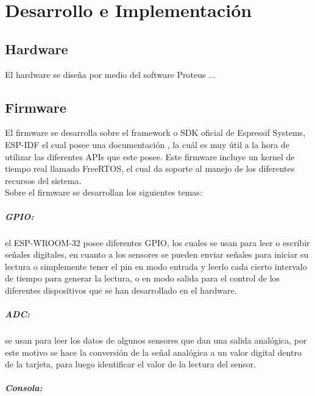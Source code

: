 \chapter{Desarrollo e Implementación}

\section{Hardware}

El hardware se diseña por medio del software Proteus ...

\section{Firmware}

El firmware se desarrolla sobre el framework o SDK oficial de Espressif Systems, ESP-IDF el cual posee una documentación \cite{ES}, la cuál es muy útil a la hora de utilizar las diferentes APIs que este posee. Este firmware incluye un kernel de tiempo real llamado FreeRTOS, el cual da soporte al manejo de los diferentes recursos del sistema.\\

Sobre el firmware se desarrollan los siguientes temas:

\paragraph{GPIO:}

el ESP-WROOM-32 posee diferentes GPIO, los cuales se usan para leer o escribir señales digitales, en cuanto a los sensores se pueden enviar señales para iniciar su lectura o simplemente tener el pin en modo entrada y leerlo cada cierto intervalo de tiempo para generar la lectura, o en modo salida para el control de los diferentes dispositivos que se han desarrollado en el hardware.

\paragraph{ADC:}

se usan para leer los datos de algunos sensores que dan una salida analógica, por este motivo se hace la conversión de la señal analógica a un valor digital dentro de la tarjeta, para luego identificar el valor de la lectura del sensor. 

\paragraph{Consola:}

